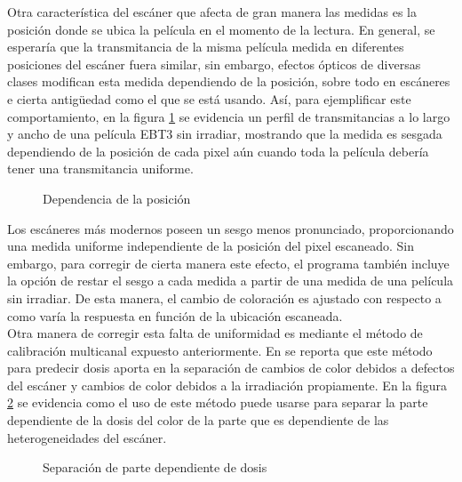 Otra característica del escáner que afecta de gran manera las medidas es la posición donde se ubica la película en el momento de la lectura. En general, se esperaría que la transmitancia de la misma película medida en diferentes posiciones del escáner fuera similar, sin embargo, efectos ópticos de diversas clases modifican esta medida dependiendo de la posición, sobre todo en escáneres e cierta antigüedad como el que se está usando. Así, para ejemplificar este comportamiento, en la figura \ref{fig:dependeciaDePosicion} se evidencia un perfil de transmitancias a lo largo y ancho de una película EBT3 sin irradiar, mostrando que la medida es sesgada dependiendo de la posición de cada pixel aún cuando toda la película debería tener una transmitancia uniforme. \\
\begin{figure}
	\centering
	
	\caption{Dependencia de la posición}
	\label{fig:dependeciaDePosicion}
\end{figure}

Los escáneres más modernos poseen un sesgo menos pronunciado, proporcionando una medida uniforme independiente de la posición del pixel escaneado. Sin embargo, para corregir de cierta manera este efecto, el programa también incluye la opción de restar el sesgo a cada medida a partir de una medida de una película sin irradiar. De esta manera, el cambio de coloración es ajustado con respecto a como varía la respuesta en función de la ubicación escaneada. \\

Otra manera de corregir esta falta de uniformidad es mediante el método de calibración multicanal expuesto anteriormente. En \cite{Micke2011} se reporta que este método para predecir dosis aporta en la separación de cambios de color debidos a defectos del escáner y cambios de color debidos a la irradiación propiamente. En la figura \ref{fig:Multicanal} se evidencia como el uso de este método puede usarse para separar la parte dependiente de la dosis del color de la parte que es dependiente de las heterogeneidades del escáner. \\

\begin{figure}
	\centering
	
	\caption{Separación de parte dependiente de dosis}
	\label{fig:Multicanal}
\end{figure}

